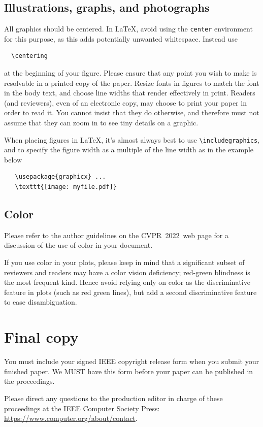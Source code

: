 \documentclass[10pt,twocolumn,letterpaper]{article}
\def\confName{CVPR}
\def\confYear{2022}
\begin{document}
\subsection{Illustrations, graphs, and photographs}

All graphics should be centered.
In \LaTeX, avoid using the \texttt{center} environment for this purpose, as this adds potentially unwanted whitespace.
Instead use
{\small\begin{verbatim}
  \centering
\end{verbatim}}
at the beginning of your figure.
Please ensure that any point you wish to make is resolvable in a printed copy of the paper.
Resize fonts in figures to match the font in the body text, and choose line widths that render effectively in print.
Readers (and reviewers), even of an electronic copy, may choose to print your paper in order to read it.
You cannot insist that they do otherwise, and therefore must not assume that they can zoom in to see tiny details on a graphic.

When placing figures in \LaTeX, it's almost always best to use \verb+\includegraphics+, and to specify the figure width as a multiple of the line width as in the example below
{\small\begin{verbatim}
   \usepackage{graphicx} ...
   \texttt{[image: myfile.pdf]}
\end{verbatim}
}


\subsection{Color}

Please refer to the author guidelines on the \confName\ \confYear\ web page for a discussion of the use of color in your document.

If you use color in your plots, please keep in mind that a significant subset of reviewers and readers may have a color vision deficiency; red-green blindness is the most frequent kind.
Hence avoid relying only on color as the discriminative feature in plots (such as red \vs green lines), but add a second discriminative feature to ease disambiguation.

\section{Final copy}

You must include your signed IEEE copyright release form when you submit your finished paper.
We MUST have this form before your paper can be published in the proceedings.

Please direct any questions to the production editor in charge of these proceedings at the IEEE Computer Society Press:
\url{https://www.computer.org/about/contact}.


{\small


}
\end{document}
